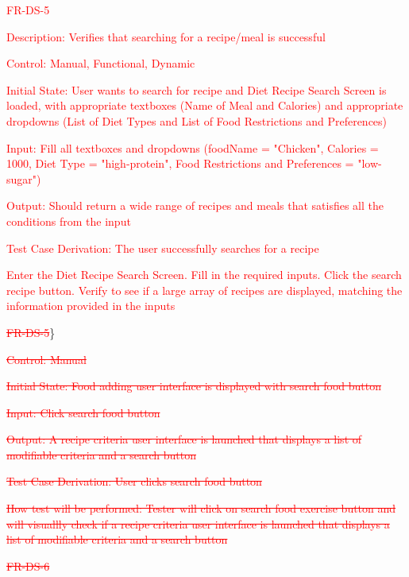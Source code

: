 \documentclass[12pt, titlepage]{article}
\begin{document}
\begin{enumerate}
   \item{\textcolor{red}{FR-DS-5\\}}

 \textcolor{red}{Description: Verifies that searching for a recipe/meal is successful}
	
	\textcolor{red}{Control: Manual, Functional, Dynamic}
	
	\textcolor{red}{Initial State: User wants to search for recipe and Diet Recipe Search Screen is loaded, with appropriate textboxes (Name of Meal and Calories) and appropriate dropdowns (List of Diet Types and List of Food Restrictions and Preferences)}
	
	\textcolor{red}{Input: Fill all textboxes and dropdowns (foodName = "Chicken", Calories = 1000, Diet Type = "high-protein", Food Restrictions and Preferences = "low-sugar")}
	
	\textcolor{red}{Output: Should return a wide range of recipes and meals that satisfies all the conditions from the input}
	
	\textcolor{red}{Test Case Derivation: The user successfully searches for a recipe}
	
	\textcolor{red}{Enter the Diet Recipe Search Screen. Fill in the required inputs. Click the search recipe button. Verify to see if a large array of recipes are displayed, matching the information provided in the inputs}
	
\item{\textcolor{red}{\sout{FR-DS-5}}\}
	
\textcolor{red}{\sout{Control: Manual}}

\textcolor{red}{\sout{Initial State: Food adding user interface is displayed with search food button}}

\textcolor{red}{\sout{Input: Click search food button}}

\textcolor{red}{\sout{Output: A recipe criteria user interface is launched that displays a list of modifiable criteria and a search button}}

\textcolor{red}{\sout{Test Case Derivation: User clicks search food button}}

\textcolor{red}{\sout{How test will be performed: Tester will click on search food exercise button and will visuallly check if a recipe criteria user interface is launched that displays a list of modifiable criteria and a search button}}

\item{\textcolor{red}{\sout{FR-DS-6}}\\}

}
\end{enumerate}
\end{document}
